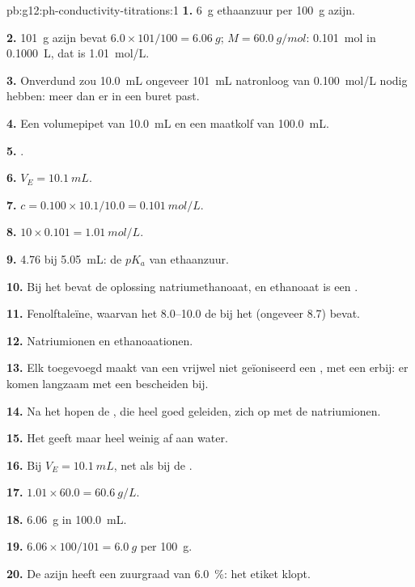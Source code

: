 \begin{solution}{pb:g12:ph-conductivity-titrations:1}
\textbf{1.} \qty{6}{g} ethaanzuur per \qty{100}{g} azijn.

\textbf{2.} \qty{101}{g} azijn bevat $6.0 \times 101/100 =
\qty{6.06}{g}$; $M = \qty{60.0}{g/mol}$: \qty{0.101}{mol} in
\qty{0.1000}{L}, dat is \qty{1.01}{mol/L}.

\textbf{3.} Onverdund zou \qty{10.0}{mL} ongeveer \qty{101}{mL} natronloog
van \qty{0.100}{mol/L} nodig hebben: meer dan er in een buret past.

\textbf{4.} Een volumepipet van \qty{10.0}{mL} en een maatkolf van
\qty{100.0}{mL}.

\textbf{5.} .

\textbf{6.} $V_E = \qty{10.1}{mL}$.

\textbf{7.} $c = 0.100 \times 10.1 / 10.0 = \qty{0.101}{mol/L}$.

\textbf{8.} $10 \times 0.101 = \qty{1.01}{mol/L}$.

\textbf{9.}  4.76 bij \qty{5.05}{mL}: de $pK_a$ van ethaanzuur.

\textbf{10.} Bij het  bevat de oplossing natriumethanoaat,
en ethanoaat is een .

\textbf{11.} Fenolftaleïne, waarvan het  8.0--10.0 de  bij
het  (ongeveer 8.7) bevat.

\textbf{12.} Natriumionen en ethanoaationen.

\textbf{13.} Elk toegevoegd  maakt van een vrijwel niet
geïoniseerd  een
, met een  erbij: er komen langzaam  met een
bescheiden  bij.

\textbf{14.} Na het  hopen de , die heel
goed geleiden, zich op met de natriumionen.

\textbf{15.} Het  geeft maar heel weinig  af aan water.

\textbf{16.} Bij $V_E = \qty{10.1}{mL}$, net als bij de .

\textbf{17.} $1.01 \times 60.0 = \qty{60.6}{g/L}$.

\textbf{18.} \qty{6.06}{g} in \qty{100.0}{mL}.

\textbf{19.} $6.06 \times 100 / 101 = \qty{6.0}{g}$ per \qty{100}{g}.

\textbf{20.} De azijn heeft een zuurgraad van \qty{6.0}{\percent}: het etiket
klopt.
\end{solution}
